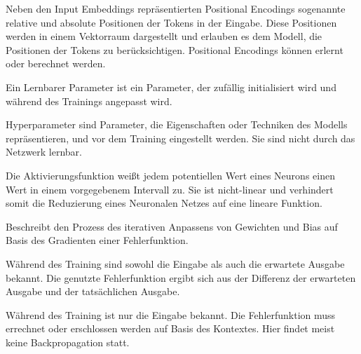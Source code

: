 \begin{definition}\label{def:positional-encodings}
    Neben den Input Embeddings repräsentierten Positional Encodings sogenannte relative und absolute Positionen der Tokens in der Eingabe.
    Diese Positionen werden in einem Vektorraum dargestellt und erlauben es dem Modell, die Positionen der Tokens zu berücksichtigen.
    Positional Encodings können erlernt oder berechnet werden.
\end{definition}



\begin{definition}\label{def:lernbare-parameter}
    Ein Lernbarer Parameter ist ein Parameter, der zufällig initialisiert wird und während des Trainings angepasst wird.
\end{definition}

\begin{definition}[Hyperparameter]\label{def:hyperparameter}
    Hyperparameter sind Parameter, die Eigenschaften oder Techniken des Modells repräsentieren, und vor dem Training eingestellt werden.
    Sie sind nicht durch das Netzwerk lernbar.
\end{definition}

\begin{definition}[Aktivierungsfunktion]\label{def:aktivierungsfunktion}
    Die Aktivierungsfunktion weißt jedem potentiellen Wert eines Neurons einen Wert in einem vorgegebenem Intervall zu.
    Sie ist nicht-linear und verhindert somit die Reduzierung eines Neuronalen Netzes auf eine lineare Funktion.
\end{definition}

\begin{definition}[Backpropagation]\label{def:backpropagation}
    Beschreibt den Prozess des iterativen Anpassens von Gewichten und Bias auf Basis des Gradienten einer Fehlerfunktion.
\end{definition}

\begin{definition}\label{def:überwachtes-lernen}
    Während des Training sind sowohl die Eingabe als auch die erwartete Ausgabe bekannt.
    Die genutzte Fehlerfunktion ergibt sich aus der Differenz der erwarteten Ausgabe und der tatsächlichen Ausgabe.
\end{definition}

\begin{definition}\label{def:unüberwachtes-lernen}
    Während des Training ist nur die Eingabe bekannt.
    Die Fehlerfunktion muss errechnet oder erschlossen werden auf Basis des Kontextes.
    Hier findet meist keine Backpropagation statt.
\end{definition}


